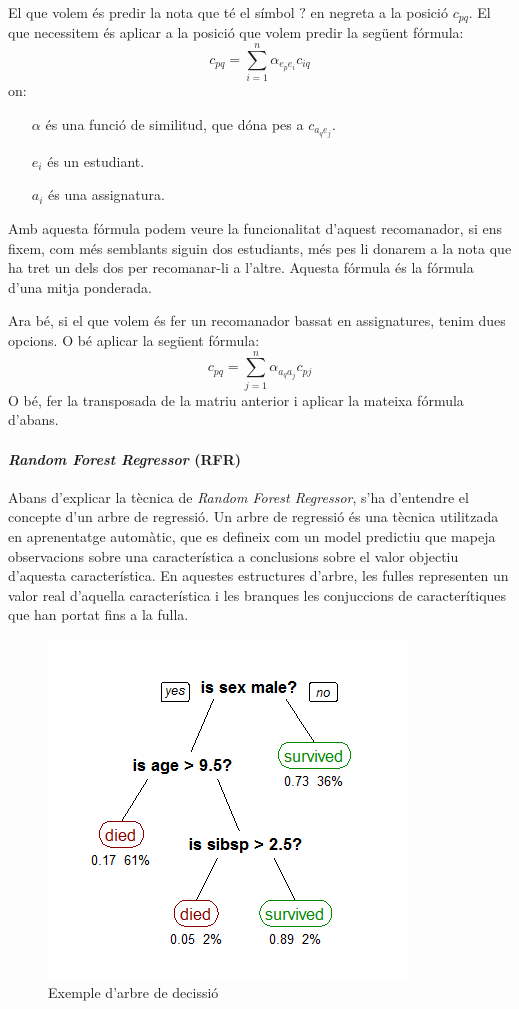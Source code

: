 \documentclass[12pt,a4paper,catalan]{article}
\begin{document}
El que volem és predir la nota que té el símbol $?$ en negreta a la posició $c_{pq}$. El que necessitem és aplicar a la posició que volem predir la següent fórmula:
$$
	c_{pq} = \sum_{i=1}^n{\alpha_{e_pe_i}c_{iq}}
$$
on:
\begin{itemize}[leftmargin=.5in]
	\item [$\alpha$] és una funció de similitud, que dóna pes a $c_{a_qe_j}$.
	\item [$e_i$] és un estudiant.
	\item [$a_i$] és una assignatura.
\end{itemize}

Amb aquesta fórmula podem veure la funcionalitat d'aquest recomanador, si ens fixem, com més semblants siguin dos estudiants, més pes li donarem a la nota que ha tret un dels dos per recomanar-li a l'altre. Aquesta fórmula és la fórmula d'una mitja ponderada.

\newpage

Ara bé, si el que volem és fer un recomanador bassat en assignatures, tenim dues opcions. O bé aplicar la següent fórmula:
$$
	c_{pq} = \sum_{j=1}^n{\alpha_{a_qa_j}c_{pj}}
$$
O bé, fer la transposada de la matriu anterior i aplicar la mateixa fórmula d'abans.

\paragraph{\textit{Random Forest Regressor} (RFR)}
Abans d'explicar la tècnica de \textit{Random Forest Regressor}, s'ha d'entendre el concepte d'un arbre de regressió. Un arbre de regressió és una tècnica utilitzada en aprenentatge automàtic, que es defineix com un model predictiu que mapeja observacions sobre una característica a conclusions sobre el valor objectiu d'aquesta característica. En aquestes estructures d'arbre, les fulles representen un valor real d'aquella característica i les branques les conjuccions de caracterítiques que han portat fins a la fulla.

\begin{figure}[h]
\centering
\includegraphics[width=.5\linewidth]{img/randomforest.png}
\caption{Exemple d'arbre de decissió \cite{imgrandomforestregressor}}
\end{figure}
\end{document}
